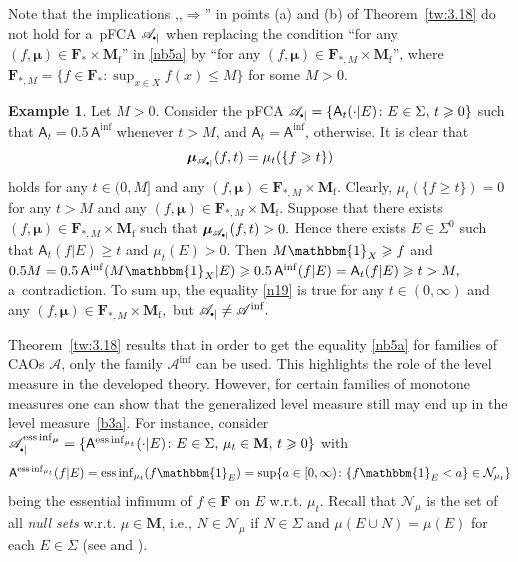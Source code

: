 \documentclass[preprint,11pt]{elsarticle}
\theoremstyle{definition}
\newtheorem{example}[tw]{Example}
\newcommand\bF{\mathbf{F}} %
\newcommand\bFa{\mathbf{F}_{\ast}} %
\newcommand\bFam{\mathbf{F}_{\ast,M}} %
\newcommand\bM{\mathbf{M}} %
\newcommand\bMf{\mathbf{M}_{\mathrm{f}}}%
\newcommand\sA{\mathsf{A}}
\newcommand\aAi[3][E]{\sA^{#3}(#2|#1)}%
\newcommand\sbullet[1][.5]{\mathbin{\vcenter{\hbox{\scalebox{#1}{$\bullet$}}}}}
\newcommand\bA{\mathscr{A}}%
\newcommand\bpA{\mathscr {A}_{\sbullet|}}%
\newcommand{\bmu}{\boldsymbol{\mu}}
\renewcommand\ge{\geqslant}
\renewcommand\le{\leqslant}
\newcommand{\mI}[1]{\mathbbm{1}_{#1}}%
\newcommand{\tx}{\textstyle{}}
\begin{document}
Note that the implications ,,$\Rightarrow$'' in points (a) and (b) of Theorem~\ref{tw:3.18}  do not hold for a~pFCA $\bpA$ when replacing the condition ``for any  $(f,\bmu)\in \bFa\times\bMf$'' in \eqref{nb5a} by ``for any  $(f,\bmu)\in \bFam\times \bMf$'', where $\bFam=\{f\in \bFa\colon {\tx \sup_{x\in X} f(x)\le M}\}$ for some $M>0.$

\begin{example}\label{ex:3.17}
Let $M>0.$ Consider the pFCA $\bpA = \{\sA_t(\cdot|E)\colon E\in \Sigma,\,t\ge 0\}$ such that $\sA_t=0.5\,\sA^{\inf}$ whenever $t> M$, and $\sA_t = \sA^{\inf}$, otherwise. It is clear that
\begin{align}\label{n19}
    \bmu_{\bpA}(f,t)=\mu_t(\{f\ge t\})
\end{align}
holds for any $t\in (0,M]$ and any $(f,\bmu)\in \bFam\times \bMf.$  Clearly, $\mu_t(\{f\ge t\})=0$ for any $t>M$ and any $(f,\bmu)\in \bFam\times \bMf.$
Suppose that there exists $(f,\bmu)\in \bFam\times \bMf$ such that $\bmu_{\bpA}(f,t) >0.$ Hence there exists $E\in\Sigma^0$  such that $\sA_t(f|E)\ge t$ and $\mu_t(E)>0.$ Then $M\mI{X}\ge f$ and $0.5M=0.5\,\sA^{\inf}(M\mI{X}|E)\ge 0.5\,\sA^{\inf}(f|E)=\sA_t(f|E)\ge t>M,$ a~contradiction.
To sum up, the equality \eqref{n19} is true for any $t\in (0,\infty)$ and any $(f,\bmu)\in \bFam\times \bMf,$
but $\bpA\neq \bA^{\inf}.$
\end{example}

\medskip

Theorem~\ref{tw:3.18} results that in order to get the equality \eqref{nb5a}
for families of CAOs $\bA$, only the family $\bA^{\inf}$ can be used.
This highlights the role of the level measure in the developed theory. However, for certain families of monotone measures one can show that the generalized level measure  still may end up in the level measure~\eqref{b3a}.
For instance, consider  $\bpA^{\operatorname*{ess\,inf}_{\bmu}}=\{\sA^{\operatorname*{ess\,inf}_{\mu_t}}(\cdot|E)\colon E\in \Sigma,\,\mu_t\in\bM,\,t\ge 0\}$ with
\begin{align*}
   \aAi{f}{\operatorname*{ess\,inf}_{\mu_t}}=\operatorname*{ess\,inf}\nolimits_{\mu_t} (f\mI{E})=\sup\{a\in  [0,\infty)\colon \{f\mI{E}<a\}\in\mathcal{N}_{\mu_t}\}
\end{align*}
being the essential infimum of $f\in\bF$ on $E$ w.r.t. $\mu_t.$
Recall that $\mathcal{N}_\mu$ is the set of all \textit{null sets} w.r.t. $\mu\in\bM$, i.e.,  $N\in\mathcal{N}_\mu$ if $N\in \Sigma$ and $\mu(E\cup N) = \mu(E)$ for each $E\in \Sigma$ (see \cite[Def.~2.107]{grabisch2016} and \cite[Thm. 2.108\,(vii)]{grabisch2016}).
\end{document}
